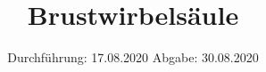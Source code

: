 

\subject{TPS Praktikum}
\title{Brustwirbelsäule}
\date{%
	Durchführung: 17.08.2020
	\hspace{3em}
	Abgabe: 30.08.2020
}


	\maketitle
	\thispagestyle{empty}
	\tableofcontents
	\newpage

	
	
	
	

	\newpage

	\printbibliography{}


